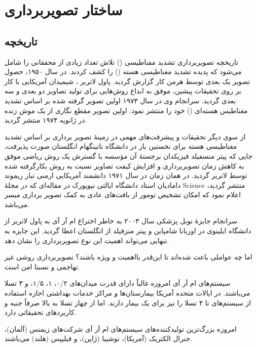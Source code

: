 \section{ساختار تصویربرداری \mri}\label{sec:mri-basics}

\subsection{تاریخچه}


تاریخچه تصویربرداری تشدید مفناطیسی
(\mri)
تلاش تعداد زیادی از محققانی را شامل می‌شود که پدیده تشدید مغناطیسی هسته
()
را کشف کردند.
در سال ۱۹۵۰، حصول تصویر یک بعدی \mri توسط هرمن کار 
 گزارش گردید. پاول لاتربر 
، شیمیدان آمریکایی با کار بر روی تحقیقات پیشین، موفق به ابداع روش‌هایی برای تولید تصاویر دو بعدی و سه بعدی \mri گردید. سرانجام وی در سال ۱۹۷۳ اولین تصویر گرفته شده بر اساس تشدید مغناطیس هسته‌ای () خود را منتشر نمود. اولین تصویر مقطع نگاری از یک موش زنده در ژانویه ۱۹۷۴ منتشر گردید.


از سوی دیگر تحقیقات و پیشرفت‌های مهمی در زمینهٔ تصویر برداری بر اساس تشدید مغناطیسی هسته برای نخستین بار در دانشگاه ناتینگهام انگلستان 
صورت پذیرفت، جایی که پیتر منسفیلد فیزیکدان برجستهٔ آن مؤسسه با گسترش یک روش ریاضی موفق به کاهش زمان تصویربرداری و افزایش کیفت تصاویر نسبت به روش بکارگرفته شده توسط لاتربر گردید. در همان زمان در سال ۱۹۷۱ دانشمند آمریکایی ارمنی تبار ریموند دامادیان استاد دانشگاه ایالتی نیویورک در مقاله‌ای که در مجلهٔ Science منتشر گردید، اعلام نمود که امکان تشخیص تومور از بافت‌های عادی به کمک تصویر برداری 
 میسر می‌باشد.

سرانجام جایزهٔ نوبل پزشکی سال ۲۰۰۳ به خاطر اختراع ام آر آی به پاول لاتربر از دانشگاه ایلینوی در اوربانا شامپاین و پیتر منزفیلد از انگلستان اعطا گردید. 
این جایزه به تنهایی می‌تواند اهمیت این نوع تصویربرداری را نشان دهد.

اما چه عواملی باعث شده‌اند تا این‌قدر \mri بااهمیت و ویژه باشند؟ تصویربرداری \mri روشی غیر تهاجمی و نسبتا امن است. 

سیستم‌های ام آر آی امروزه غالباً دارای قدرت میدان‌های ۰/۲، ۱، ۱/۵، و ۳ تسلا می‌باشند.
در ایالات متحده آمریکا بیمارستان‌ها و مراکز خدمات بهداشتی اجازه استفاده از سیستم‌های تا ۴ تسلا را نیز برای یک بیمار دارند. اما از چهار تسلا به بالا صرفاً جنبه و کاربردهای تحقیقاتی دارد.

امروزه بزرگ‌ترین تولیدکننده‌های سیستم‌های ام آر آی شرکت‌های زیمنس (آلمان)، جنرال الکتریک (آمریکا)، توشیبا (ژاپن)، و فیلیپس (هلند) می‌باشند.

